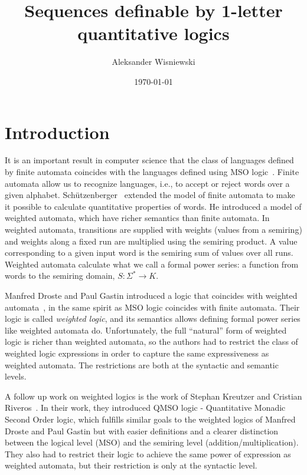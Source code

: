 \documentclass[12pt]{article}
\title{Sequences definable by 1-letter quantitative logics}
\author{Aleksander Wisniewski}
\date{\today}
\theoremstyle{definition}
\begin{document}
\maketitle

\section{Introduction}
It is an important result in computer science that the class of languages defined by finite automata coincides with the languages defined using MSO logic~\cite{Buchi1960}. Finite automata allow us to recognize languages, i.e., to accept or reject words over a given alphabet. Sch{\"{u}}tzenberger~\cite{Schutzenberger61b} extended the model of finite automata to make it possible to calculate quantitative properties of words. He introduced a model of weighted automata, which have richer semantics than finite automata. In weighted automata, transitions are supplied with weights (values from a semiring) and weights along a fixed run are multiplied using the semiring product. A value corresponding to a given input word is the semiring sum of values over all runs. Weighted automata calculate what we call a formal power series: a function from words to the semiring domain, $S: \Sigma^* \rightarrow K$.

Manfred Droste and Paul Gastin introduced a logic that coincides with weighted automata~\cite{DrosteG07}, in the same spirit as MSO logic coincides with finite automata. Their logic is called \emph{weighted logic}, and its semantics allows defining formal power series like weighted automata do. Unfortunately, the full ``natural'' form of weighted logic is richer than weighted automata, so the authors had to restrict the class of weighted logic expressions in order to capture the same expressiveness as weighted automata. The restrictions are both at the syntactic and semantic levels.

A follow up work on weighted logics is the work of Stephan Kreutzer and Cristian Riveros~\cite{KreutzerR13}. In their work, they introduced QMSO logic - Quantitative Monadic Second Order logic, which fulfills similar goals to the weighted logics of Manfred Droste and Paul Gastin but with easier definitions and a clearer distinction between the logical level (MSO) and the semiring level (addition/multiplication). They also had to restrict their logic to achieve the same power of expression as weighted automata, but their restriction is only at the syntactic level.
\end{document}
